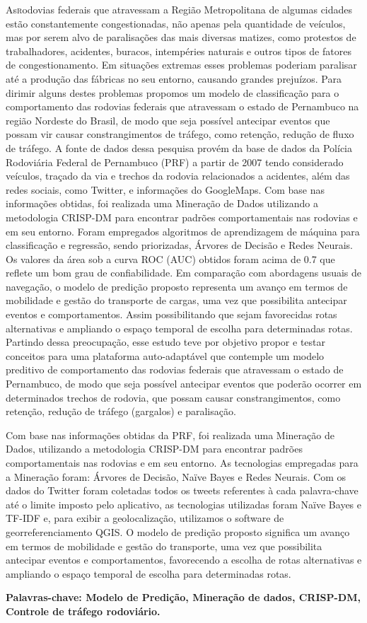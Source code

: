 \vspace*{12pt}

\lettrine {As} rodovias federais que atravessam a Região
Metropolitana de algumas cidades estão constantemente
congestionadas, não apenas pela quantidade de veículos,
mas por serem alvo de paralisações das mais diversas
matizes, como protestos de trabalhadores, acidentes,
buracos, intempéries naturais e outros tipos de fatores de
congestionamento. Em situações extremas esses problemas
poderiam paralisar até a produção das fábricas no seu
entorno, causando grandes prejuízos. Para dirimir alguns
destes problemas propomos um modelo de classificação
para o comportamento das rodovias federais que
atravessam o estado de Pernambuco na região Nordeste do
Brasil, de modo que seja possível antecipar eventos que
possam vir causar constrangimentos de tráfego, como
retenção, redução de fluxo de tráfego. A fonte de dados
dessa pesquisa provém da base de dados da Polícia
Rodoviária Federal de Pernambuco (PRF) a partir de 2007
tendo considerado veículos, traçado da via e trechos da
rodovia relacionados a acidentes, além das redes sociais, como Twitter, e informações do GoogleMaps. Com base
nas informações obtidas, foi realizada uma Mineração de
Dados utilizando a metodologia CRISP-DM para
encontrar padrões comportamentais nas rodovias e em seu
entorno. Foram empregados algoritmos de aprendizagem
de máquina para classificação e regressão, sendo
priorizadas, Árvores de Decisão e Redes Neurais. Os
valores da área sob a curva ROC (AUC) obtidos foram
acima de 0.7 que reflete um bom grau de confiabilidade.
Em comparação com abordagens usuais de navegação, o
modelo de predição proposto representa um avanço em
termos de mobilidade e gestão do transporte de cargas,
uma vez que possibilita antecipar eventos e
comportamentos. Assim possibilitando que sejam
favorecidas rotas alternativas e ampliando o espaço
temporal de escolha para determinadas rotas. 
Partindo dessa preocupação, esse estudo teve por objetivo propor e testar conceitos para uma plataforma auto-adaptável que 
contemple um modelo preditivo de comportamento das rodovias federais que atravessam o estado de Pernambuco, de modo que seja 
possível antecipar eventos que poderão ocorrer em determinados trechos de rodovia, que possam causar constrangimentos, 
como retenção, redução de tráfego (gargalos) e paralisação.

Com base nas informações obtidas da PRF, foi realizada uma Mineração de Dados, utilizando a metodologia CRISP-DM para encontrar padrões comportamentais nas rodovias e em seu entorno. As tecnologias empregadas para a Mineração foram: Árvores de Decisão, Naïve Bayes e  Redes Neurais. 
Com os dados do Twitter foram coletadas todos os tweets referentes à cada palavra-chave até o limite imposto pelo aplicativo, as tecnologias utilizadas foram Naïve Bayes e TF-IDF e, para exibir a geolocalização, utilizamos o software de georreferenciamento QGIS.
O modelo de predição proposto significa um avanço em termos de mobilidade e gestão do transporte, uma vez que possibilita antecipar eventos e comportamentos, favorecendo a escolha de rotas alternativas e ampliando o espaço temporal de escolha para determinadas rotas.



\par
\vspace{2em}
\noindent\textbf{Palavras-chave: Modelo de Predição, Mineração de dados, CRISP-DM, Controle de tráfego rodoviário.}
